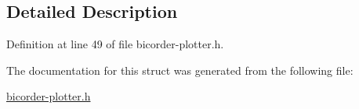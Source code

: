 \subsection{Detailed Description}


Definition at line 49 of file bicorder-\/plotter.\+h.



The documentation for this struct was generated from the following file\+:\begin{DoxyCompactItemize}
\item 
\hyperlink{bicorder-plotter_8h}{bicorder-\/plotter.\+h}\end{DoxyCompactItemize}
